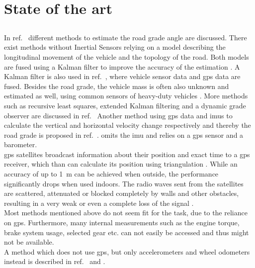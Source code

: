 \chapter{State of the art}
\label{ch:StateOfTheArt}
\section{}
In ref.~\cite{Jauch2018} different methods to estimate the road grade angle are discussed.
There exist methods without Inertial Sensors relying on a model describing the longitudinal movement of the vehicle and the topology of the road.
Both models are fused using a Kalman filter to improve the accuracy of the estimation \cite{Sahlholm2007}.
A Kalman filter is also used in ref.~\cite{Sahlholm2010}, where vehicle sensor data and \gls{gps} data are fused.
Besides the road grade, the vehicle mass is often also unknown and estimated as well, using common sensors of heavy-duty vehicles \cite{Sahlholm2010, Maleej2014}.
More methods such as recursive least squares, extended Kalman filtering and a dynamic grade observer are discussed in ref.~\cite{Kidambi2014}
Another method using \gls{gps} data and \gls{imu}s to calculate the vertical and horizontal velocity change respectively and thereby the road grade is proposed in ref.~\cite{Ryu2004}.
\cite{YazdaniBoroujeni2014} omits the \gls{imu} and relies on a \gls{gps} sensor and a barometer.\\
\gls{gps} satellites broadcast information about their position and exact time to a \gls{gps} receiver, which than can calculate its position using triangulation \cite{Mainetti2014}.
While an accuracy of up to \SI{1}{\metre} can be achieved when outside, the performance significantly drops when used indoors.
The radio waves sent from the satellites are scattered, attenuated or blocked completely by walls and other obstacles, resulting in a very weak or even a complete loss of the signal \cite{Ozdenizci2015}.\\
Most methods mentioned above do not seem fit for the task, due to the reliance on \gls{gps}.
Furthermore, many internal measurements such as the engine torque, brake system usage, selected gear etc. can not easily be accessed and thus might not be available.\\
A method which does not use \gls{gps}, but only accelerometers and wheel odometers instead is described in ref.~\cite{Nilsson2012} and \cite{Palella2016}.

